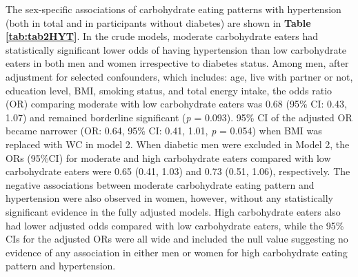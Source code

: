 The sex-specific associations of carbohydrate eating patterns with hypertension (both in total and in participants without diabetes) are shown in \textbf{Table \ref{tab:tab2HYT}}. In the crude models, moderate carbohydrate eaters had statistically significant lower odds of having hypertension than low carbohydrate eaters in both men and women irrespective to diabetes status. Among men, after adjustment for selected confounders, which includes: age, live with partner or not, education level, BMI, smoking status, and total energy intake, the odds ratio (OR) comparing moderate with low carbohydrate eaters was 0.68 (95\% CI: 0.43, 1.07) and remained borderline significant (\textit{p} = 0.093). 95\% CI of the adjusted OR became narrower (OR: 0.64, 95\% CI: 0.41, 1.01, \textit{p} = 0.054) when BMI was replaced with WC in model 2. When diabetic men were excluded in Model 2, the ORs (95\%CI) for moderate and high carbohydrate eaters compared with low carbohydrate eaters were 0.65 (0.41, 1.03) and 0.73 (0.51, 1.06), respectively. The negative associations between moderate carbohydrate eating pattern and hypertension were also observed in women, however, without any statistically significant evidence in the fully adjusted models. High carbohydrate eaters also had lower adjusted odds compared with low carbohydrate eaters, while the 95\% CIs for the adjusted ORs were all wide and included the null value suggesting no evidence of any association in either men or women for high carbohydrate eating pattern and hypertension.

